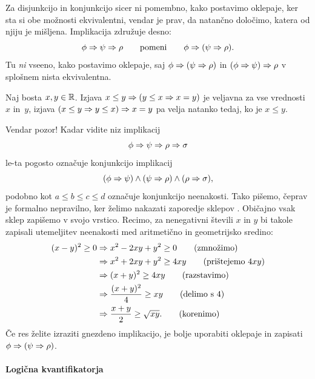 %
Za disjunkcijo in konjunkcijo sicer ni pomembno, kako postavimo
oklepaje, ker sta si obe možnosti ekvivalentni, vendar je prav,
da natančno določimo, katera od njiju je mišljena.
Implikacija združuje desno:
%
\begin{equation*}
  \phi \Rightarrow \psi \Rightarrow \rho
  \qquad\text{pomeni}\qquad
  \phi \Rightarrow (\psi \Rightarrow \rho).
\end{equation*}
%
Tu \emph{ni} vseeno, kako postavimo oklepaje, saj $\phi \Rightarrow (\psi \Rightarrow \rho)$ in $(\phi \Rightarrow \psi) \Rightarrow \rho$ v splošnem nista ekvivalentna.

\begin{zgled}
  Naj bosta $x, y \in \mathbb{R}$. Izjava $x \leq y \Rightarrow (y \leq x \Rightarrow x = y)$ je veljavna za vse vrednosti~$x$ in~$y$,
  izjava $(x \leq y \Rightarrow y \leq x) \Rightarrow x = y$ pa velja natanko tedaj, ko je $x \leq y$.
\end{zgled}

Vendar pozor! Kadar vidite niz implikacij
%
\begin{equation*}
  \phi \Rightarrow \psi \Rightarrow \rho \Rightarrow \sigma
\end{equation*}
%
le-ta pogosto označuje konjunkcijo implikacij
%
\begin{equation*}
  (\phi \Rightarrow \psi) \land (\psi \Rightarrow \rho) \land (\rho \Rightarrow \sigma),
\end{equation*}
%
podobno kot $a \leq b \leq c \leq d$ označuje konjunkcijo neenakosti.
Tako pišemo, čeprav je formalno nepravilno, ker želimo nakazati zaporedje sklepov
.
Običajno vsak sklep zapišemo v svojo vrstico. Recimo, za nenegativni števili $x$ in
$y$ bi takole zapisali utemeljitev neenakosti med aritmetično in
geometrijsko sredino:
%
\begin{align*}
  (x - y)^2 \geq 0
  &\Rightarrow x^2 - 2 x y + y^2 \geq 0
  \tag{zmnožimo}\\
  &\Rightarrow x^2 + 2 x y + y^2 \geq 4 x y
  \tag{prištejemo $4 x y$}\\
  &\Rightarrow (x + y)^2 \geq 4 x y
  \tag{razstavimo}\\
  &\Rightarrow \frac{(x + y)^2}{4} \geq x y
  \tag{delimo s $4$}\\
  &\Rightarrow \frac{x+y}{2} \geq \sqrt{x y}.
  \tag{korenimo}
\end{align*}
%
Če res želite izraziti gnezdeno implikacijo, je bolje uporabiti oklepaje in zapisati $\phi \Rightarrow (\psi
\Rightarrow \rho)$.


\paragraph*{Logična kvantifikatorja}
\label{sec:logicna-kvant}

